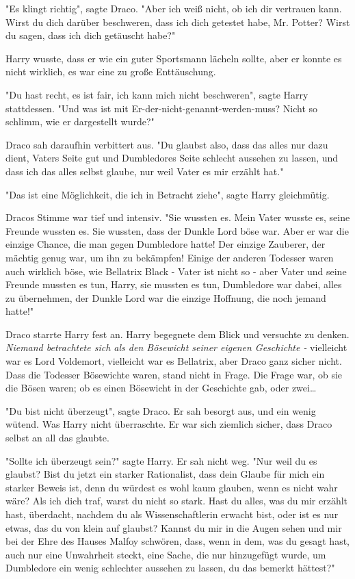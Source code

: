 {"Es klingt richtig", sagte Draco. "Aber ich weiß nicht, ob ich dir vertrauen kann. Wirst du dich darüber beschweren, dass ich dich getestet habe, Mr. Potter? Wirst du sagen, dass ich dich getäuscht habe?"

Harry wusste, dass er wie ein guter Sportsmann lächeln sollte, aber er konnte es nicht wirklich, es war eine zu große Enttäuschung.

"Du hast recht, es ist fair, ich kann mich nicht beschweren", sagte Harry stattdessen. "Und was ist mit Er-der-nicht-genannt-werden-muss? Nicht so schlimm, wie er dargestellt wurde?"

Draco sah daraufhin verbittert aus. "Du glaubst also, dass das alles nur dazu dient, Vaters Seite gut und Dumbledores Seite schlecht aussehen zu lassen, und dass ich das alles selbst glaube, nur weil Vater es mir erzählt hat."

"Das ist eine Möglichkeit, die ich in Betracht ziehe", sagte Harry gleichmütig.

Dracos Stimme war tief und intensiv. "Sie wussten es. Mein Vater wusste es, seine Freunde wussten es. Sie wussten, dass der Dunkle Lord böse war. Aber er war die einzige Chance, die man gegen Dumbledore hatte! Der einzige Zauberer, der mächtig genug war, um ihn zu bekämpfen! Einige der anderen Todesser waren auch wirklich böse, wie Bellatrix Black - Vater ist nicht so - aber Vater und seine Freunde mussten es tun, Harry, sie mussten es tun, Dumbledore war dabei, alles zu übernehmen, der Dunkle Lord war die einzige Hoffnung, die noch jemand hatte!"

Draco starrte Harry fest an. Harry begegnete dem Blick und versuchte zu denken. \emph{Niemand betrachtete sich als den Bösewicht seiner eigenen Geschichte -} vielleicht war es Lord Voldemort, vielleicht war es Bellatrix, aber Draco ganz sicher nicht. Dass die Todesser Bösewichte waren, stand nicht in Frage. Die Frage war, ob sie die Bösen waren; ob es einen Bösewicht in der Geschichte gab, oder zwei…

"Du bist nicht überzeugt", sagte Draco. Er sah besorgt aus, und ein wenig wütend. Was Harry nicht überraschte. Er war sich ziemlich sicher, dass Draco selbst an all das glaubte.

"Sollte ich überzeugt sein?" sagte Harry. Er sah nicht weg. "Nur weil du es glaubst? Bist du jetzt ein starker Rationalist, dass dein Glaube für mich ein starker Beweis ist, denn du würdest es wohl kaum glauben, wenn es nicht wahr wäre? Als ich dich traf, warst du nicht so stark. Hast du alles, was du mir erzählt hast, überdacht, nachdem du als Wissenschaftlerin erwacht bist, oder ist es nur etwas, das du von klein auf glaubst? Kannst du mir in die Augen sehen und mir bei der Ehre des Hauses Malfoy schwören, dass, wenn in dem, was du gesagt hast, auch nur eine Unwahrheit steckt, eine Sache, die nur hinzugefügt wurde, um Dumbledore ein wenig schlechter aussehen zu lassen, du das bemerkt hättest?"

}
